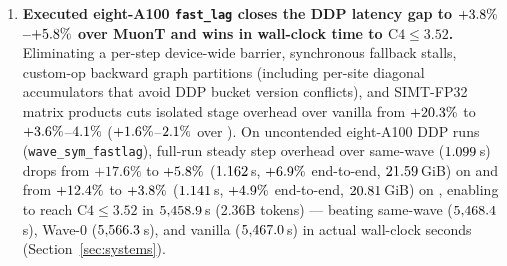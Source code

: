 \begin{enumerate}
\item \textbf{Executed eight-A100 \texttt{fast\_lag} closes the DDP latency gap
  to $+3.8\%$--$+5.8\%$ over MuonT and
  wins in wall-clock time to $\text{C4}\le 3.52$.}
  Eliminating a per-step device-wide barrier, synchronous fallback stalls,
  custom-op backward graph partitions (including per-site diagonal accumulators
  that avoid DDP bucket version conflicts), and SIMT-FP32 matrix products cuts
  isolated stage overhead over vanilla  from $+20.3\%$
  to $+3.6\%$--$4.1\%$
  ($+1.6\%$--$2.1\%$ over ). On
  uncontended eight-A100 DDP runs (\texttt{wave\_sym\_fastlag}), full-run steady
  step overhead over same-wave  ($1.099$\,s) drops
  from $+17.6\%$ to $+5.8\%$ ($1.162$\,s,
  $+6.9\%$ end-to-end, $21.59$\,GiB) on
   and from $+12.4\%$ to
  $+3.8\%$ ($1.141$\,s,
  $+4.9\%$ end-to-end, $20.81$\,GiB) on
  , enabling  to reach $\text{C4}\le 3.52$ in
  $5{,}458.9$\,s ($2.36\text{B}$ tokens) --- beating
  same-wave  ($5{,}468.4$\,s), Wave-0
   ($5{,}566.3$\,s), and vanilla
   ($5{,}467.0$\,s) in actual wall-clock
  seconds (Section~\ref{sec:systems}).
\end{enumerate}

